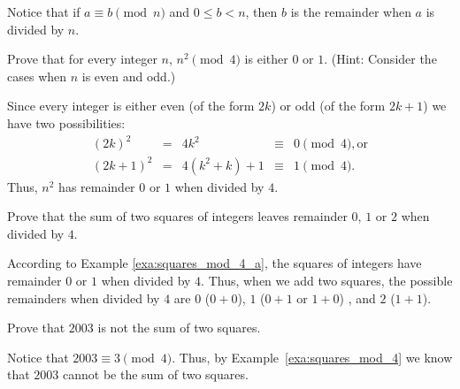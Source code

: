 Notice that if $a\equiv b\pmod n$ and $0\leq b < n$, then 
$b$ is the remainder when $a$ is divided by $n$.

\begin{exer}\label{exa:squares_mod_4_a}
Prove that for every integer $n$, $n^2\pmod 4$ is either $0$ or $1$.
(Hint: Consider the cases when $n$ is even and odd.)
\vspace*{1.5in}
\begin{answer}
Since every integer is either even (of the form $2k$) or odd (of
the form $2k + 1$) we have two possibilities:
$$\begin{array}{lllll}(2k)^2 & = & 4k^2&\equiv&0\pmod 4, \mbox{or}\\
(2k + 1)^2 & = & 4(k^2 + k) + 1&\equiv&1\pmod 4.
  \end{array}$$
Thus, $n^2$ has remainder $0$ or $1$ when divided by $4$.  
\end{answer}
\end{exer}

\begin{exa}\label{exa:squares_mod_4}
 Prove that the sum of two
squares of integers leaves remainder $0$, $1$ or $2$ when divided
by $4$.
\begin{pf}
According to Example \ref{exa:squares_mod_4_a}, 
the squares of integers  have remainder $0$ or $1$
when divided by $4$.  Thus, when we add two squares, the possible remainders when divided by $4$
are $0$ ($0+0$), $1$ ($0+1$ or $1+0$) , and $2$ ($1+1$).
\end{pf}
\end{exa}

\begin{exa}
Prove that $2003$ is not the sum of two squares.
\begin{pf}
Notice that $2003\equiv 3\pmod 4$.  Thus, by Example~\ref{exa:squares_mod_4} we know that $2003$
cannot be the sum of two squares.
\end{pf}
\end{exa}


